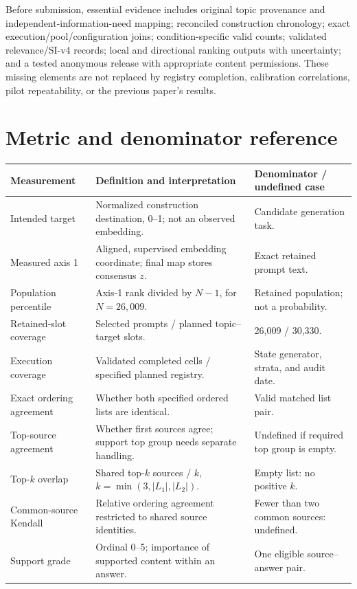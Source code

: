 Before submission, essential evidence includes original topic provenance and independent-information-need mapping; reconciled construction chronology; exact execution/pool/configuration joins; condition-specific valid counts; validated relevance/SI-v4 records; local and directional ranking outputs with uncertainty; and a tested anonymous release with appropriate content permissions. These missing elements are not replaced by registry completion, calibration correlations, pilot repeatability, or the previous paper's results.

\clearpage
\section{Metric and denominator reference}
\label{app:metrics}
\begin{table}[!htbp]
\small
\begin{tabularx}{\textwidth}{@{}p{}Yp{.26\textwidth}@{}}
\toprule
Measurement & Definition and interpretation & Denominator / undefined case\\
\midrule
Intended target & Normalized construction destination, 0--1; not an observed embedding. & Candidate generation task.\\
Measured axis 1 & Aligned, supervised embedding coordinate; final map stores consensus $z$. & Exact retained prompt text.\\
Population percentile & Axis-1 rank divided by $N-1$, for $N=26,009$. & Retained population; not a probability.\\
Retained-slot coverage & Selected prompts / planned topic--target slots. & 26,009 / 30,330.\\
Execution coverage & Validated completed cells / specified planned registry. & State generator, strata, and audit date.\\
Exact ordering agreement & Whether both specified ordered lists are identical. & Valid matched list pair.\\
Top-source agreement & Whether first sources agree; support top group needs separate handling. & Undefined if required top group is empty.\\
Top-$k$ overlap & Shared top-$k$ sources / $k$, $k=\min(3,|L_1|,|L_2|)$. & Empty list: no positive $k$.\\
Common-source Kendall & Relative ordering agreement restricted to shared source identities. & Fewer than two common sources: undefined.\\
Support grade & Ordinal 0--5; importance of supported content within an answer. & One eligible source--answer pair.\\

\end{tabularx}
\end{table}
